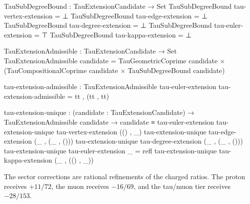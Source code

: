 \documentclass[11pt]{article}
\begin{document}
\begin{code}
TauSubDegreeBound : TauExtensionCandidate → Set
TauSubDegreeBound tau-vertex-extension = ⊥
TauSubDegreeBound tau-edge-extension   = ⊥
TauSubDegreeBound tau-degree-extension = ⊥
TauSubDegreeBound tau-euler-extension  = ⊤
TauSubDegreeBound tau-kappa-extension  = ⊥

TauExtensionAdmissible : TauExtensionCandidate → Set
TauExtensionAdmissible candidate =
  TauGeometricCoprime candidate ×
  (TauCompositionalCoprime candidate × TauSubDegreeBound candidate)

tau-extension-admissible : TauExtensionAdmissible tau-euler-extension
tau-extension-admissible = tt , (tt , tt)

tau-extension-unique :
  (candidate : TauExtensionCandidate) →
  TauExtensionAdmissible candidate → candidate ≡ tau-euler-extension
tau-extension-unique tau-vertex-extension (() , _)
tau-extension-unique tau-edge-extension (_ , (_ , ()))
tau-extension-unique tau-degree-extension (_ , (_ , ()))
tau-extension-unique tau-euler-extension _ = refl
tau-extension-unique tau-kappa-extension (_ , (() , _))
\end{code}

The sector corrections are rational refinements of the charged ratios.  The
proton receives $+11/72$, the muon receives $-16/69$, and the tau/muon tier
receives $-28/153$.
\end{document}
